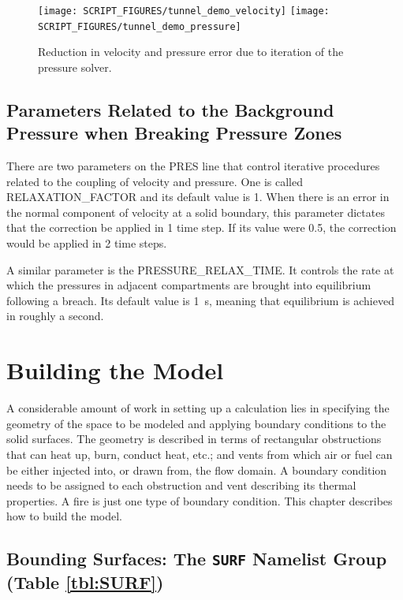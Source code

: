 \documentclass[11pt]{book}
\begin{document}
\begin{figure}[ht]
\texttt{[image: SCRIPT\_FIGURES/tunnel\_demo\_velocity]}
\texttt{[image: SCRIPT\_FIGURES/tunnel\_demo\_pressure]}
\caption[Convergence test for the {\ct tunnel\_demo} test case]{Reduction in velocity and pressure error due to iteration of the pressure solver.}
\label{tunnel_demo_fig}
\end{figure}


\section{Parameters Related to the Background Pressure when Breaking Pressure Zones}

There are two parameters on the {\ct PRES} line that control iterative procedures related to the coupling of velocity and pressure. One is
called {\ct RELAXATION\_FACTOR} and its default value is 1. When there is an error in the normal component of velocity at a solid boundary, this
parameter dictates that the correction be applied in 1 time step. If its value were 0.5, the correction would be applied in 2 time steps.

A similar parameter is the {\ct PRESSURE\_RELAX\_TIME}. It controls the rate at which the pressures in adjacent compartments are brought into equilibrium following a
breach. Its default value is 1~s, meaning that equilibrium is achieved in roughly a second.











\chapter{Building the Model}

A considerable amount of work in setting up a calculation lies in specifying the
geometry of the space to be modeled and applying boundary conditions
to the solid surfaces. The geometry is described in terms
of rectangular obstructions that can heat up, burn, conduct heat, etc.;
and vents from which air or fuel can be
either injected into, or drawn from, the flow domain.
A boundary condition needs to be assigned to each obstruction
and vent describing its thermal properties. A fire is just one type of
boundary condition. This chapter describes how to build the model.


\section{Bounding Surfaces: The \texorpdfstring{{\tt SURF}}{SURF} Namelist Group (Table \ref{tbl:SURF})}
\label{info:SURF}
\end{document}
